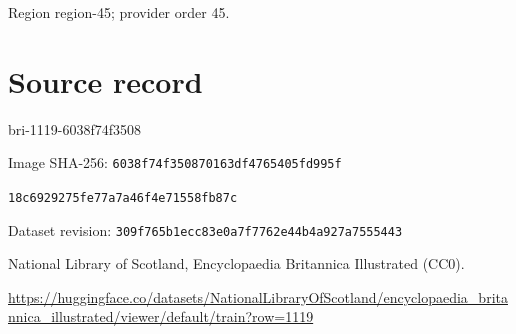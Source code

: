 \documentclass[11pt]{article}
\begin{document}
{\scriptsize\color{gray} Region region-45; provider order 45.\par}
\medskip
\newpage\section*{Source record}
bri-1119-6038f74f3508\par
Image SHA-256: \texttt{6038f74f350870163df4765405fd995f}\par\texttt{18c6929275fe77a7a46f4e71558fb87c}\par
Dataset revision: \texttt{309f765b1ecc83e0a7f7}\texttt{762e44b4a927a7555443}\par
National Library of Scotland, Encyclopaedia Britannica Illustrated (CC0).\par
\url{https://huggingface.co/datasets/NationalLibraryOfScotland/encyclopaedia_britannica_illustrated/viewer/default/train?row=1119}
\end{document}
